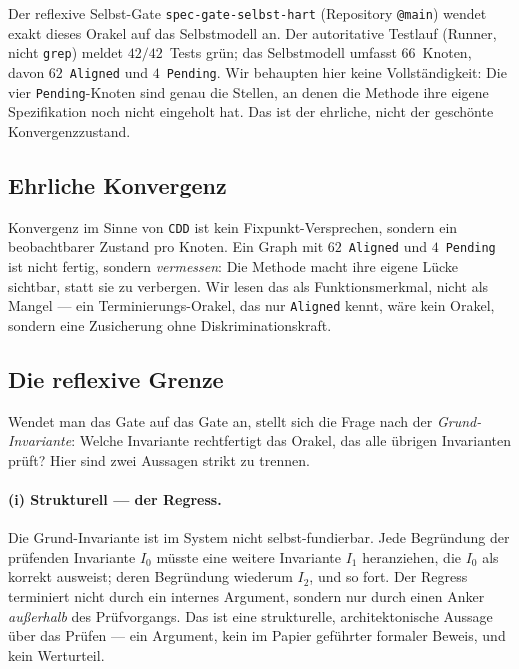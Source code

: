 \documentclass[11pt,a4paper]{article}
\theoremstyle{definition}
\theoremstyle{remark}
\begin{document}
Der reflexive Selbst-Gate \texttt{spec-gate-selbst-hart}
(Repository \texttt{@main}) wendet exakt dieses Orakel auf das Selbstmodell
an. Der autoritative Testlauf (Runner, nicht \texttt{grep}) meldet
$42/42$~Tests grün; das Selbstmodell umfasst $66$~Knoten, davon $62$~\texttt{Aligned}
und $4$~\texttt{Pending}. Wir behaupten hier keine Vollständigkeit: Die vier
\texttt{Pending}-Knoten sind genau die Stellen, an denen die Methode ihre eigene
Spezifikation noch nicht eingeholt hat. Das ist der ehrliche, nicht der
geschönte Konvergenzzustand.

\subsection{Ehrliche Konvergenz}
\label{sec:reflexiv-konvergenz}

Konvergenz im Sinne von \texttt{CDD} ist kein Fixpunkt-Versprechen, sondern ein
beobachtbarer Zustand pro Knoten. Ein Graph mit $62$~\texttt{Aligned} und
$4$~\texttt{Pending} ist nicht \glqq fertig\grqq, sondern \emph{vermessen}: Die
Methode macht ihre eigene Lücke sichtbar, statt sie zu verbergen. Wir lesen das
als Funktionsmerkmal, nicht als Mangel --- ein Terminierungs-Orakel, das nur
\texttt{Aligned} kennt, wäre kein Orakel, sondern eine Zusicherung ohne
Diskriminationskraft.

\subsection{Die reflexive Grenze}
\label{sec:reflexiv-grenze}

Wendet man das Gate auf das Gate an, stellt sich die Frage nach der
\emph{Grund-Invariante}: Welche Invariante rechtfertigt das Orakel, das alle
übrigen Invarianten prüft? Hier sind zwei Aussagen strikt zu trennen.

\paragraph{(i) Strukturell --- der Regress.}
Die Grund-Invariante ist im System nicht selbst-fundierbar. Jede Begründung der
prüfenden Invariante $I_0$ müsste eine weitere Invariante $I_1$ heranziehen, die
$I_0$ als korrekt ausweist; deren Begründung wiederum $I_2$, und so fort. Der
Regress terminiert nicht durch ein internes Argument, sondern nur durch einen
Anker \emph{außerhalb} des Prüfvorgangs. Das ist eine strukturelle, architektonische
Aussage über das Prüfen --- ein Argument, kein im Papier geführter formaler Beweis,
und kein Werturteil.
\end{document}
